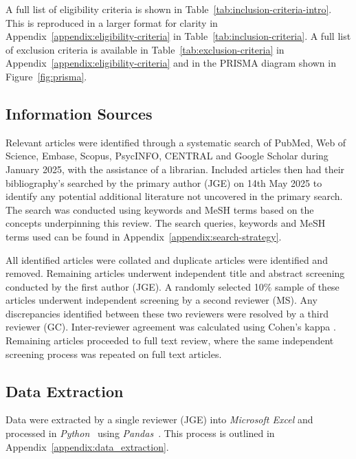 \noindent A full list of eligibility criteria is shown in Table~\ref{tab:inclusion-criteria-intro}. This is reproduced in a larger format for clarity in Appendix~\ref{appendix:eligibility-criteria} in Table~\ref{tab:inclusion-criteria}. A full list of exclusion criteria is available in Table~\ref{tab:exclusion-criteria} in Appendix~\ref{appendix:eligibility-criteria} and in the PRISMA diagram shown in Figure~\ref{fig:prisma}.

\subsection{Information Sources}

\noindent Relevant articles were identified through a systematic search of PubMed, Web of Science, Embase, Scopus, PsycINFO, CENTRAL and Google Scholar during January 2025, with the assistance of a librarian. Included articles then had their bibliography's searched by the primary author (JGE) on 14th May 2025 to identify any potential additional literature not uncovered in the primary search. The search was conducted using keywords and MeSH terms based on the concepts underpinning this review. The search queries, keywords and MeSH terms used can be found in Appendix~\ref{appendix:search-strategy}. 

All identified articles were collated and duplicate articles were identified and removed. Remaining articles underwent independent title and abstract screening conducted by the first author (JGE). A randomly selected 10\% sample of these articles underwent independent screening by a second reviewer (MS). Any discrepancies identified between these two reviewers were resolved by a third reviewer (GC). Inter-reviewer agreement was calculated using Cohen's kappa \cite{Machin_2008}. Remaining articles proceeded to full text review, where the same independent screening process was repeated on full text articles.

\subsection{Data Extraction}

\noindent Data were extracted by a single reviewer (JGE) into \textit{Microsoft Excel} \cite{MicrosoftCorporation_2025} and processed in \textit{Python}~\cite{PythonSoftwareFoundation_2025} using \textit{Pandas}~\cite{ThePandasDevelopmentTeam_2020}. This process is outlined in Appendix~\ref{appendix:data_extraction}. 

